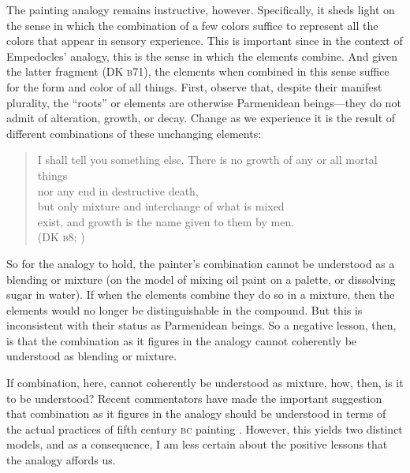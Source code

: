 The painting analogy remains instructive, however. Specifically, it sheds light on the sense in which the combination of a few colors suffice to represent all the colors that appear in sensory experience. This is important since in the context of Empedocles' analogy, this is the sense in which the elements combine. And given the latter fragment (DK \textsc{b}71), the elements when combined in this sense suffice for the form and color of all things. First, observe that, despite their manifest plurality, the ``roots'' or elements are otherwise Parmenidean beings---they do not admit of alteration, growth, or decay. Change as we experience it is the result of different combinations of these unchanging elements:
\begin{verse}
    I shall tell you something else. There is no growth of any or all mortal things\\
    nor any end in destructive death,\\
    but only mixture and interchange of what is mixed\\
    exist, and growth is the name given to them by men.\\
    (DK \textsc{b}8; \citealt[21 221]{Inwood:2001ve})
\end{verse}
So for the analogy to hold, the painter's combination cannot be understood as a blending or mixture (on the model of mixing oil paint on a palette, or dissolving sugar in water). If when the elements combine they do so in a mixture, then the elements would no longer be distinguishable in the compound. But this is inconsistent with their status as Parmenidean beings. So a negative lesson, then, is that the combination as it figures in the analogy cannot coherently be understood as blending or mixture.

If combination, here, cannot coherently be understood as mixture, how, then, is it to be understood? Recent commentators have made the important suggestion that combination as it figures in the analogy should be understood in terms of the actual practices of fifth century \textsc{bc} painting \citep{Wright:1981zr,Mourelatos:1987fk,Ierodiakonou:2005fk}. However, this yields two distinct models, and as a consequence, I am less certain about the positive lessons that the analogy affords us.

